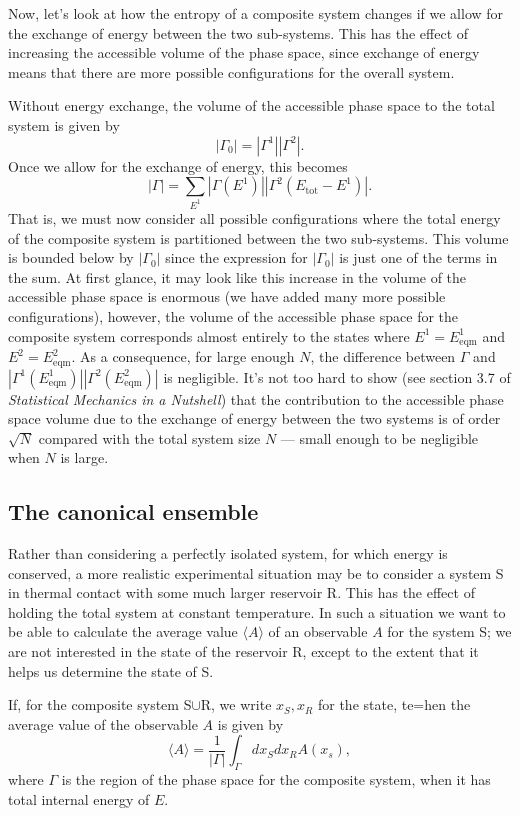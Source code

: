 \documentclass{article}
\begin{document}
Now, let's look at how the entropy of a composite system changes if we allow for the exchange of energy between the two sub-systems. This has the effect of increasing the accessible volume of the phase space, since exchange of energy means that there are more possible configurations for the overall system.

Without energy exchange, the volume of the accessible phase space to the total system is given by
$$
	|\Gamma_0| = |\Gamma^1||\Gamma^2|.
$$
Once we allow for the exchange of energy, this becomes
$$
	|\Gamma| = \sum_{E^1}|\Gamma(E^1)||\Gamma^2(E_\text{tot}-E^1)|.
$$
That is, we must now consider all possible configurations where the total energy of the composite system is partitioned between the two sub-systems. This volume is bounded below by $|\Gamma_0|$ since the expression for $|\Gamma_0|$ is just one of the terms in the sum. At first glance, it may look like this increase in the volume of the accessible phase space is enormous (we have added many more possible configurations), however, the volume of the accessible phase space for the composite system corresponds almost entirely to the states where $E^1=E^1_\text{eqm}$ and $E^2=E^2_\text{eqm}$. As a consequence, for large enough $N$, the difference between $\Gamma$ and $|\Gamma^1(E^1_\text{eqm})||\Gamma^2(E^2_\text{eqm})|$ is negligible. It's not too hard to show (see section 3.7 of \emph{Statistical Mechanics in a Nutshell}) that the contribution to the accessible phase space volume due to the exchange of energy between the two systems is of order $\sqrt{N}$ compared with the total system size $N$ --- small enough to be negligible when $N$ is large.

\subsection*{The canonical ensemble}

Rather than considering a perfectly isolated system, for which energy is conserved, a more realistic experimental situation may be to consider a system S in thermal contact with some much larger reservoir R. This has the effect of holding the total system at constant temperature. In such a situation we want to be able to calculate the average value $\langle A\rangle$ of an observable $A$ for the system S; we are not interested in the state of the reservoir R, except to the extent that it helps us determine the state of S.

If, for the composite system S$\cup$R, we write $x_S,x_R$ for the state, te=hen the average value of the observable $A$ is given by
$$
	\langle A\rangle = \frac{1}{|\Gamma|}\int_{\Gamma}dx_Sdx_RA(x_s),
$$
where $\Gamma$ is the region of the phase space for the composite system, when it has total internal energy of $E$.
\end{document}
